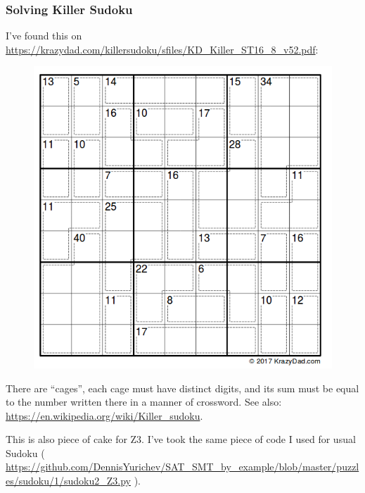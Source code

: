 \subsubsection{Solving Killer Sudoku}

I've found this on \url{https://krazydad.com/killersudoku/sfiles/KD_Killer_ST16_8_v52.pdf}:

\begin{figure}[H]
\centering
\includegraphics[scale=0.6]{puzzles/sudoku/killer/puzzle.png}
\caption{}
\end{figure}

There are ``cages'', each cage must have distinct digits,
and its sum must be equal to the number written there in a manner of crossword.
See also: \url{https://en.wikipedia.org/wiki/Killer_sudoku}.

This is also piece of cake for Z3.
I've took the same piece of code I used for usual Sudoku ( \url{https://github.com/DennisYurichev/SAT_SMT_by_example/blob/master/puzzles/sudoku/1/sudoku2_Z3.py} ).

